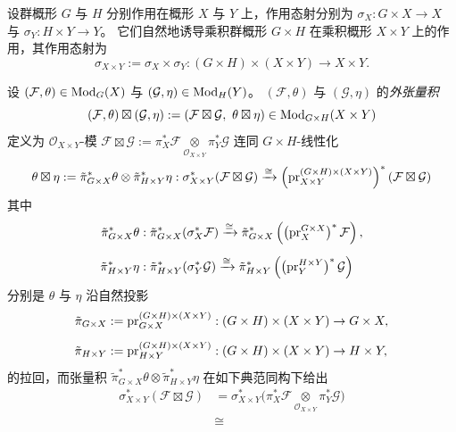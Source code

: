 设群概形 $G$ 与 $H$ 分别作用在概形 $X$ 与 $Y$ 上，作用态射分别为
$\sigma_X : G \times X \rightarrow X$
与
$\sigma_Y : H \times Y \rightarrow Y$。
它们自然地诱导乘积群概形 $G\times H$ 在乘积概形 $X\times Y$ 上的作用，其作用态射为
$$
\sigma_{X\times Y}
:=
\sigma_X\times \sigma_Y
:
(G\times H)\times (X\times Y)
\rightarrow
X\times Y.
$$
\begin{defn}[等变层的外张量积]
\label{defn:ExternalTensorProductOfEquivariantModules}
设 $(\mathcal{F},\theta)\in\operatorname{\mathrm{Mod}}_G(X)$ 与
$(\mathcal{G},\eta)\in\operatorname{\mathrm{Mod}}_H(Y)$。
$(\mathcal{F},\theta)$ 与 $(\mathcal{G},\eta)$ 的\emph{外张量积}
$$
(\mathcal{F},\theta)\boxtimes(\mathcal{G},\eta)
:=
\left(
\mathcal{F}\boxtimes\mathcal{G},
\
\theta\boxtimes\eta
\right)
\in\operatorname{\mathrm{Mod}}_{G\times H}(X\times Y)
$$
定义为 $\mathcal{O}_{X\times Y}$-模
$
\mathcal{F}\boxtimes\mathcal{G}
:=
\pi_X^*\mathcal{F}
\underset{\mathcal{O}_{X\times Y}}{\otimes}
\pi_Y^*\mathcal{G}
$
连同 $G\times H$-线性化
$$
\theta\boxtimes\eta
:=
\tilde{\pi}_{G\times X}^*\theta\otimes\tilde{\pi}_{H\times Y}^*\eta
:
\sigma_{X\times Y}^*(\mathcal{F}\boxtimes\mathcal{G})
\xrightarrow{\cong}
\left(\operatorname{\operatorname{pr}}_{X\times Y}^{(G\times H)\times(X\times Y)}\right)^*
(\mathcal{F}\boxtimes\mathcal{G})
$$
其中
\begin{align*}
\tilde{\pi}_{G\times X}^*\theta
&:
\tilde{\pi}_{G\times X}^*(\sigma_X^*\mathcal{F})
\xrightarrow{\cong}
\tilde{\pi}_{G\times X}^*\left(\left(\operatorname{\operatorname{pr}}_X^{G\times X}\right)^{\ast}\mathcal{F}\right),
\\[2mm]
\tilde{\pi}_{H\times Y}^*\eta
&:
\tilde{\pi}_{H\times Y}^*(\sigma_Y^*\mathcal{G})
\xrightarrow{\cong}
\tilde{\pi}_{H\times Y}^*\left(\left(\operatorname{\operatorname{pr}}_Y^{H\times Y}\right)^*\mathcal{G}\right)
\end{align*}
分别是 $\theta$ 与 $\eta$ 沿自然投影
\begin{align*}
\tilde{\pi}_{G\times X}
&:=
\operatorname{\operatorname{pr}}_{G\times X}^{(G\times H)\times(X\times Y)}
:
(G\times H)\times(X\times Y)
\rightarrow
G\times X,
\\[2mm]
\tilde{\pi}_{H\times Y}
&:=
\operatorname{\operatorname{pr}}_{H\times Y}^{(G\times H)\times(X\times Y)}
:
(G\times H)\times(X\times Y)
\rightarrow
H\times Y,
\end{align*}
的拉回，而张量积
$
\tilde{\pi}_{G\times X}^*\theta\otimes\tilde{\pi}_{H\times Y}^*\eta
$
在如下典范同构下给出
\begin{align*}
\sigma_{X\times Y}^*(\mathcal{F}\boxtimes\mathcal{G})
&=
\sigma_{X\times Y}^*
\Big(
\pi_X^*\mathcal{F}
\underset{\mathcal{O}_{X\times Y}}{\otimes}
\pi_Y^*\mathcal{G}
\Big)
\\[2mm]
&\cong

\end{align*}
\end{defn}
